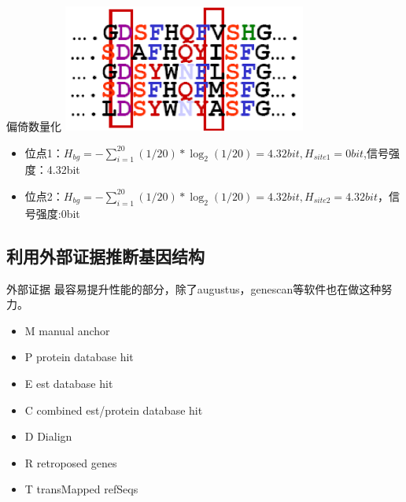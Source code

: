 \documentclass[handout]{beamer}
\begin{document}
\begin{frame}{偏倚数量化}
\includegraphics[width=8cm]{../pic/entropy_sample}
\begin{itemize}
\item 位点1：$H_{bg}=-\sum^{20}_{i=1}(1/20)*\log_{2}(1/20)=4.32bit,H_{site1}=0bit$,信号强度：4.32bit\\
\item 位点2：$H_{bg}=-\sum^{20}_{i=1}(1/20)*\log_{2}(1/20)=4.32bit,H_{site2}=4.32bit$，信号强度:0bit
\end{itemize}
\end{frame}
\subsection{利用外部证据推断基因结构}

\begin{frame}{外部证据}
最容易提升性能的部分，除了augustus，genescan等软件也在做这种努力。
\begin{itemize}
\item M manual anchor 
\item P protein database hit
\item E est database hit
\item C combined est/protein database hit
\item D Dialign
\item R retroposed genes
\item T transMapped refSeqs
\end{itemize}   
\end{frame}
\end{document}
